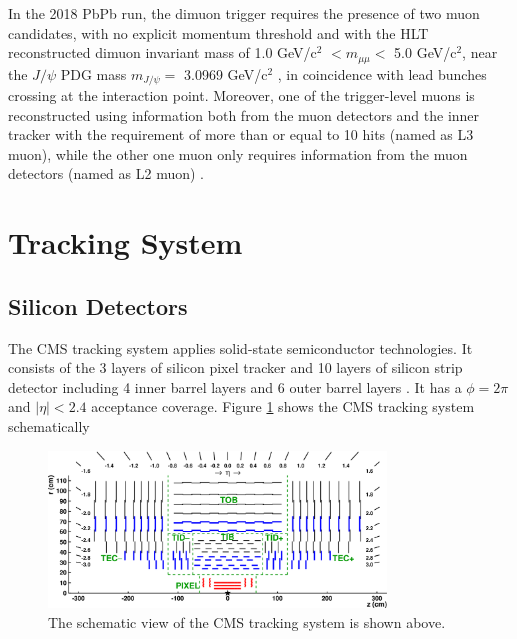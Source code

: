In the 2018 PbPb run, the dimuon trigger requires the presence of two muon candidates, with no explicit momentum threshold and with the HLT reconstructed dimuon invariant mass of 1.0 GeV/c$^2$ $< m_{\mu\mu} <$ 5.0 GeV/c$^2$, near the $J/\psi$ PDG mass $m_{J/\psi} =$ 3.0969 GeV/c$^2$ \cite{AlphaTheoEx}, in coincidence with lead bunches crossing at the interaction point. Moreover, one of the trigger-level muons is reconstructed using information both from the muon detectors and the inner tracker with the requirement of more than or equal to 10 hits (named as L3 muon), while the other one muon only requires information from the muon detectors (named as L2 muon) \cite{BAnaDimuonTrigger}.

\section{Tracking System}

\subsection{Silicon Detectors}

The CMS tracking system applies solid-state semiconductor technologies. It consists of the 3 layers of silicon pixel tracker and 10 layers of silicon strip detector including 4 inner barrel layers and 6 outer barrel layers \cite{CMSSilicon}. It has a $\phi = 2\pi$ and $|\eta| < 2.4$ acceptance coverage. Figure \ref{CMSTracker} shows the CMS tracking system schematically

\begin{figure}[hbtp]
\begin{center}
\includegraphics[width=0.80\textwidth]{Figures/Chapter3/CMSTrackingSchemtic.png}
\caption{The schematic view of the CMS tracking system is shown above.}
\label{CMSTracker}
\end{center}
\end{figure} 


